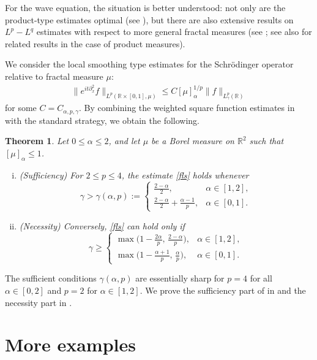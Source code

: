 \documentclass[11pt]{amsart}
\newtheorem{theorem}{Theorem}[section]
\theoremstyle{definition}
\theoremstyle{remark}
\newcommand{\R}{\mathbb{R}}
\begin{document}
For the wave equation, the situation is better understood: not only are the product-type estimates optimal (see \cite{BRRS}), but there are also extensive results on $L^p-L^q$ estimates with respect to more general fractal measures (see \cite{Oberlin, CHL, IKSTU, HKL2, CDK}; see also \cite{Har, HKL} for related results in the case of product measures).



We consider the local smoothing type estimates for the Schr\"odinger operator relative to fractal measure $\mu$:
\begin{align}\label{fls}
\big\| e^{it\partial_x^2}f \big\|_{L^p(\R\times [0,1],\mu)}
\le C [\mu]_\alpha^{1/p} \|f\|_{L_\gamma^p(\R)}
\end{align}
for some $C=C_{\alpha,p,\gamma}$.
By combining the weighted square function estimates in  with the standard strategy, we obtain the following.

\begin{theorem}\label{FLSS}
Let $0\le \alpha \le 2$, and let $\mu$ be a Borel measure on $\R^2$ such that $[\mu]_\alpha \le1$.
\vspace{-.2cm}
\begin{enumerate}[(i)]
\item
\textit{(Sufficiency)}
For $2\le p\le 4$, the estimate \eqref{fls} holds whenever
\[
  \gamma>\gamma(\alpha,p):=
  \begin{cases}
		\frac{2-\alpha}{2}, & \alpha\in[1,2],\\[.8ex]
\frac{2-\alpha}{2}+\frac{\alpha-1}{p}, & \alpha\in[0,1].
  \end{cases}
\]
\item
\textit{(Necessity)}
Conversely, \eqref{fls} can hold only if
\[
  \gamma\ge
  \begin{cases}
  \max\!\big(1-\frac{2\alpha}{p},\,\frac{2-\alpha}{p}\big), & \alpha\in[1,2],\\[.8ex]
\max\!\big(1-\frac{\alpha+1}{p},\,\frac{\alpha}{p}\big), & \alpha\in[0,1].
  \end{cases}
\]
\end{enumerate}
\end{theorem}
 The sufficient conditions $\gamma(\alpha,p)$ are essentially sharp for $p=4$ for all $\alpha\in[0,2]$ and $p=2$ for $\alpha\in [1,2]$.
We prove the sufficiency part of  in  and the necessity part in .



\section{More examples}\label{sec:MoreExamples}
\end{document}
